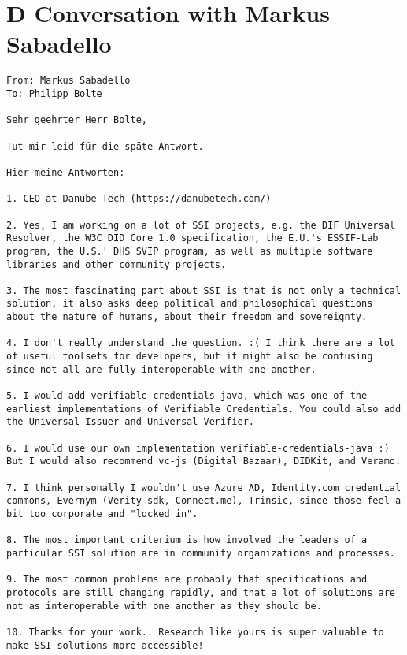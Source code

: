 \section*{D Conversation with Markus Sabadello}\label{appendix: sabadello}
\begin{Verbatim}[breaklines=true, breaksymbol={}, breaksymbolsepleftnchars=2]
From: Markus Sabadello
To: Philipp Bolte

Sehr geehrter Herr Bolte,

Tut mir leid für die späte Antwort.

Hier meine Antworten:

1. CEO at Danube Tech (https://danubetech.com/)

2. Yes, I am working on a lot of SSI projects, e.g. the DIF Universal Resolver, the W3C DID Core 1.0 specification, the E.U.'s ESSIF-Lab program, the U.S.' DHS SVIP program, as well as multiple software libraries and other community projects.

3. The most fascinating part about SSI is that is not only a technical solution, it also asks deep political and philosophical questions about the nature of humans, about their freedom and sovereignty.

4. I don't really understand the question. :( I think there are a lot of useful toolsets for developers, but it might also be confusing since not all are fully interoperable with one another.

5. I would add verifiable-credentials-java, which was one of the earliest implementations of Verifiable Credentials. You could also add the Universal Issuer and Universal Verifier.

6. I would use our own implementation verifiable-credentials-java :) But I would also recommend vc-js (Digital Bazaar), DIDKit, and Veramo.

7. I think personally I wouldn't use Azure AD, Identity.com credential commons, Evernym (Verity-sdk, Connect.me), Trinsic, since those feel a bit too corporate and "locked in".

8. The most important criterium is how involved the leaders of a particular SSI solution are in community organizations and processes.

9. The most common problems are probably that specifications and protocols are still changing rapidly, and that a lot of solutions are not as interoperable with one another as they should be.

10. Thanks for your work.. Research like yours is super valuable to make SSI solutions more accessible!


\end{Verbatim}
